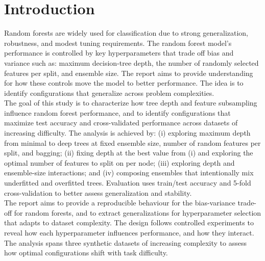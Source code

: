 \documentclass[conference]{IEEEtran}
\begin{document}
\section{Introduction}

Random forests are widely used for classification due to strong generalization, robustness, and modest tuning requirements. The random forest model's performance is controlled by key hyperparameters that trade off bias and variance such as: maximum decision-tree depth, the number of randomly selected features per split, and ensemble size. The report aims to provide understanding for how these controls move the model to better performance. The idea is to identify configurations that generalize across problem complexities.\\

The goal of this study is to characterize how tree depth and feature subsampling influence random forest performance, and to identify configurations that maximize test accuracy and cross-validated performance across datasets of increasing difficulty. The analysis is achieved by: (i) exploring maximum depth from minimal to deep trees at fixed ensemble size, number of random features per split, and bagging; (ii) fixing depth at the best value from (i) and exploring the optimal number of features to split on per node; (iii) exploring depth and ensemble-size interactions; and (iv) composing ensembles that intentionally mix underfitted and overfitted trees. Evaluation uses train/test accuracy and 5-fold cross-validation to better assess generalization and stability.\\

The report aims to provide a reproducible behaviour for the bias-variance trade-off for random forests, and to extract 
generalizations for hyperparameter selection that adapts to dataset complexity. The design follows controlled experiments to reveal how each hyperparameter influences performance, and how they interact. The analysis spans three synthetic datasets of increasing complexity to assess how optimal configurations shift with task difficulty.\\
\end{document}
